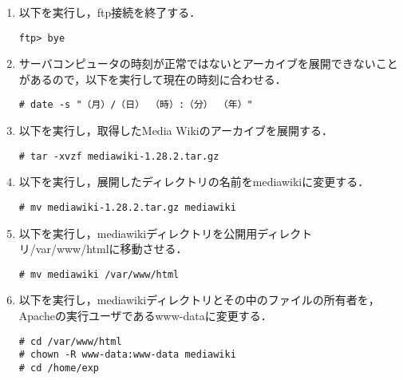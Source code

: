 \documentclass[a4j,titlepage]{jarticle}
\begin{document}
\begin{itemize}
\begin{enumerate}
\item 以下を実行し，ftp接続を終了する．
\begin{screen}
\begin{center}
\begin{verbatim}
ftp> bye
\end{verbatim}
\end{center}
\end{screen}

\item サーバコンピュータの時刻が正常ではないとアーカイブを展開できないことがあるので，以下を実行して現在の時刻に合わせる．
\begin{screen}
\begin{center}
\begin{verbatim}
# date -s "（月）/（日） （時）:（分） （年）"
\end{verbatim}
\end{center}
\end{screen}

\item 以下を実行し，取得したMedia Wikiのアーカイブを展開する．
\begin{screen}
\begin{center}
\begin{verbatim}
# tar -xvzf mediawiki-1.28.2.tar.gz
\end{verbatim}
\end{center}
\end{screen}

\item 以下を実行し，展開したディレクトリの名前をmediawikiに変更する．
\begin{screen}
\begin{center}
\begin{verbatim}
# mv mediawiki-1.28.2.tar.gz mediawiki
\end{verbatim}
\end{center}
\end{screen}

\item 以下を実行し，mediawikiディレクトリを公開用ディレクトリ/var/www/htmlに移動させる．
\begin{screen}
\begin{center}
\begin{verbatim}
# mv mediawiki /var/www/html
\end{verbatim}
\end{center}
\end{screen}

\item 以下を実行し，mediawikiディレクトリとその中のファイルの所有者を，Apacheの実行ユーザであるwww-dataに変更する．
\begin{screen}
\begin{center}
\begin{verbatim}
# cd /var/www/html
# chown -R www-data:www-data mediawiki
# cd /home/exp
\end{verbatim}
\end{center}
\end{screen}


\end{enumerate}
\end{itemize}
\end{document}
